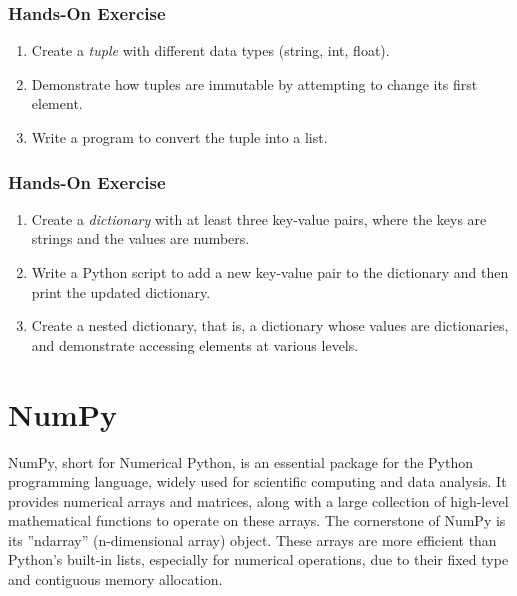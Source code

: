 \begin{tcolorbox}[colback=code]
\subsubsection*{Hands-On Exercise}
\begin{enumerate}
    \item Create a \emph{tuple} with different data types (string, int, float).
    \item Demonstrate how tuples are immutable by attempting to change its first element.
    \item Write a program to convert the tuple into a list.
\end{enumerate}
\end{tcolorbox}

\begin{tcolorbox}[colback=code]
\subsubsection*{Hands-On Exercise}
\begin{enumerate}
    \item Create a \emph{dictionary} with at least three key-value pairs, where the keys are strings and the values are numbers.
    \item Write a Python script to add a new key-value pair to the dictionary and then print the updated dictionary.
    \item Create a nested dictionary, that is, a dictionary whose values are dictionaries, and demonstrate accessing elements at various levels.
\end{enumerate}
\end{tcolorbox}

\section{NumPy}

NumPy, short for Numerical Python, is an essential package for the Python programming language, widely used for scientific computing and data analysis. It provides numerical arrays and matrices, along with a large collection of high-level mathematical functions to operate on these arrays. The cornerstone of NumPy is its ''ndarray'' (n-dimensional array) object. These arrays are more efficient than Python's built-in lists, especially for numerical operations, due to their fixed type and contiguous memory allocation.

